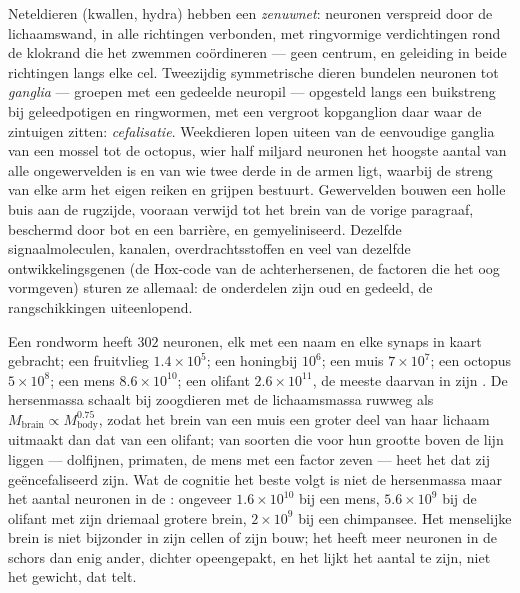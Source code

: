 \begin{definition}\label{def:b3:nervous-systems:comparative}
Neteldieren (kwallen, hydra) hebben een \emph{zenuwnet}: neuronen
verspreid door de lichaamswand, in alle richtingen verbonden, met
ringvormige verdichtingen rond de klokrand die het zwemmen coördineren
--- geen centrum, en geleiding in beide richtingen langs elke cel.
Tweezijdig symmetrische dieren bundelen neuronen tot \emph{ganglia} ---
groepen met een gedeelde neuropil --- opgesteld langs een buikstreng
bij geleedpotigen en ringwormen, met een vergroot kopganglion daar waar
de zintuigen zitten: \emph{cefalisatie}. Weekdieren lopen uiteen van de
eenvoudige ganglia van een mossel tot de octopus, wier half miljard
neuronen het hoogste aantal van alle ongewervelden is en van wie twee
derde in de armen ligt, waarbij de streng van elke arm het eigen reiken
en grijpen bestuurt. Gewervelden bouwen een holle buis aan de rugzijde,
vooraan verwijd tot het brein van de vorige paragraaf, beschermd door
bot en een barrière, en gemyeliniseerd. Dezelfde signaalmoleculen,
kanalen, overdrachtsstoffen en veel van dezelfde ontwikkelingsgenen (de
Hox-code van de achterhersenen, de factoren die het oog vormgeven)
sturen ze allemaal: de onderdelen zijn oud en gedeeld, de
rangschikkingen uiteenlopend.
\end{definition}

\begin{example}\label{ex:b3:nervous-systems:counts}
Een rondworm heeft $302$ neuronen, elk met een naam en elke synaps in
kaart gebracht; een fruitvlieg $1.4\times 10^{5}$; een honingbij
$10^{6}$; een muis $7\times 10^{7}$; een octopus $5\times 10^{8}$; een
mens $8.6\times
10^{10}$; een olifant $2.6\times 10^{11}$, de meeste daarvan in zijn
. De hersenmassa schaalt bij zoogdieren met de
lichaamsmassa ruwweg als
$M_{\text{brain}} \propto M_{\text{body}}^{0.75}$, zodat het brein van
een muis een groter deel van haar lichaam uitmaakt dan dat van een
olifant; van soorten die voor hun grootte boven de lijn liggen ---
dolfijnen, primaten, de mens met een factor zeven --- heet het dat zij
geëncefaliseerd zijn. Wat de cognitie het beste volgt is niet de
hersenmassa maar het aantal neuronen in de : ongeveer
$1.6\times 10^{10}$ bij een mens, $5.6\times 10^{9}$ bij de olifant met
zijn driemaal grotere brein, $2\times 10^{9}$ bij een chimpansee. Het
menselijke brein is niet bijzonder in zijn cellen of zijn bouw; het
heeft meer neuronen in de schors dan enig ander, dichter opeengepakt,
en het lijkt het aantal te zijn, niet het gewicht, dat telt.
\end{example}

